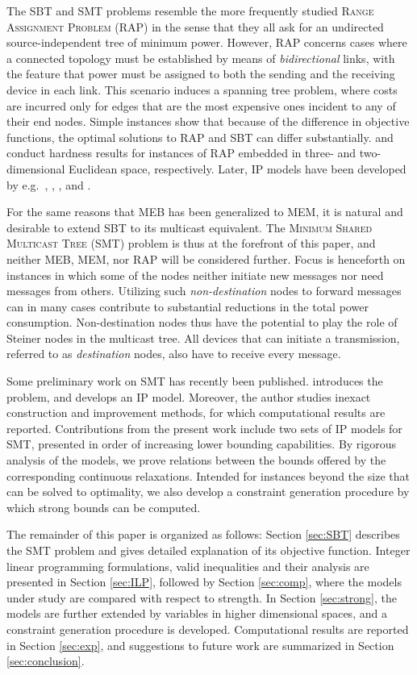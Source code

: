 The SBT and SMT problems resemble the more frequently studied \textsc{Range Assignment Problem} (RAP) in the sense that they all ask for an undirected source-independent tree of minimum power.
However, RAP concerns cases where a connected topology must be established by means of \emph{bidirectional} links,
with the feature that power must be assigned to both the sending and the receiving device in each link.
This scenario induces a spanning tree problem, where costs are incurred only for edges that are the most expensive ones incident to any of their end nodes.
Simple instances \citep{Haugland12Dual} show that because of the difference in objective functions, the optimal solutions to RAP and SBT can differ substantially.
\citet{kirousis97} and \citet{clementi99} conduct
hardness results for instances of RAP embedded in three- and two-dimensional Euclidean space, respectively.
Later, IP models have been developed by e.g.\ \citet{althaus03}, \citet{montemanni04}, \citet{das05}, and \citet{Haugland11Compact}.

For the same reasons that MEB has been generalized to MEM, it is natural and desirable to extend SBT to its multicast equivalent.
The \textsc{Minimum Shared Multicast Tree} (SMT) problem is thus at the forefront of this paper,
and neither MEB, MEM, nor RAP will be considered further.
Focus is henceforth on instances in which some of the nodes neither initiate new messages nor need messages from others.
Utilizing such \emph{non-destination} nodes to forward messages can in many cases contribute to substantial reductions in the total power consumption.
Non-destination nodes thus have the potential to play the role of Steiner nodes in the multicast tree.
All devices that can initiate a transmission, referred to as \emph{destination} nodes, also have to receive every message.

Some preliminary work on SMT has recently been published.
\citet{ivanova16isco} introduces the problem, and develops an IP model.
Moreover, the author studies inexact construction and improvement methods, for which computational results are reported.
Contributions from the present work include two sets of IP models for SMT, presented in order of increasing lower bounding capabilities.
By rigorous analysis of the models, we prove relations between the bounds offered by the corresponding continuous relaxations.
Intended for instances beyond the size that can be solved to optimality, we also develop a constraint generation procedure by which strong bounds can be computed.

The remainder of this paper is organized as follows: Section \ref{sec:SBT} describes the SMT problem and gives detailed explanation of its objective function.
Integer linear programming formulations, valid inequalities and their analysis are presented in Section \ref{sec:ILP},
followed by Section \ref{sec:comp}, where the models under study are compared with respect to strength.
In Section \ref{sec:strong}, the models are further extended by variables in higher dimensional spaces,
and a constraint generation procedure is developed.
Computational results are reported in Section \ref{sec:exp},
and suggestions to future work are summarized in Section \ref{sec:conclusion}.

